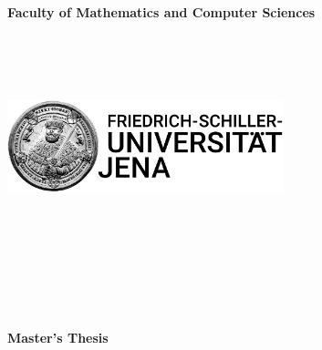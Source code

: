 \documentclass[a4paper,oneside,12pt]{report}
\begin{document}
\pagestyle{empty} %



\begin{center}
\textbf{Faculty of Mathematics and Computer Sciences\\}
\end{center}
\ \\
\ \\
\ \\
\begin{minipage}{\textwidth}
	\centering
		\includegraphics[width=0.60\textwidth]{Images/Logo_fsu.jpg}
		\label{fig:Javaterm}
\end{minipage}
\ \\
\ \\
\ \\
\ \\
\ \\
\ \\
\begin{center}
\begin{LARGE}
\textbf{Master's Thesis\\}
\end{LARGE}
\end{center}
\end{document}
